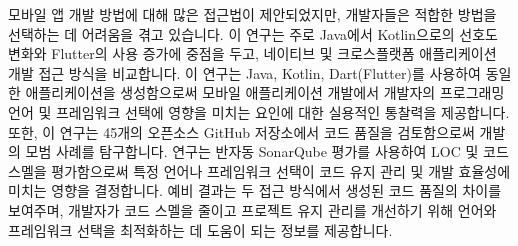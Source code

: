 
\begin{eabstract}
    모바일 앱 개발 방법에 대해 많은 접근법이 제안되었지만, 개발자들은 적합한 방법을 선택하는 데 어려움을 겪고 있습니다. 이 연구는 주로 Java에서 Kotlin으로의 선호도 변화와 Flutter의 사용 증가에 중점을 두고, 네이티브 및 크로스플랫폼 애플리케이션 개발 접근 방식을 비교합니다. 이 연구는 Java, Kotlin, Dart(Flutter)를 사용하여 동일한 애플리케이션을 생성함으로써 모바일 애플리케이션 개발에서 개발자의 프로그래밍 언어 및 프레임워크 선택에 영향을 미치는 요인에 대한 실용적인 통찰력을 제공합니다. 또한, 이 연구는 45개의 오픈소스 GitHub 저장소에서 코드 품질을 검토함으로써 개발의 모범 사례를 탐구합니다. 연구는 반자동 SonarQube 평가를 사용하여 LOC 및 코드 스멜을 평가함으로써 특정 언어나 프레임워크 선택이 코드 유지 관리 및 개발 효율성에 미치는 영향을 결정합니다. 예비 결과는 두 접근 방식에서 생성된 코드 품질의 차이를 보여주며, 개발자가 코드 스멜을 줄이고 프로젝트 유지 관리를 개선하기 위해 언어와 프레임워크 선택을 최적화하는 데 도움이 되는 정보를 제공합니다.
\end{eabstract}